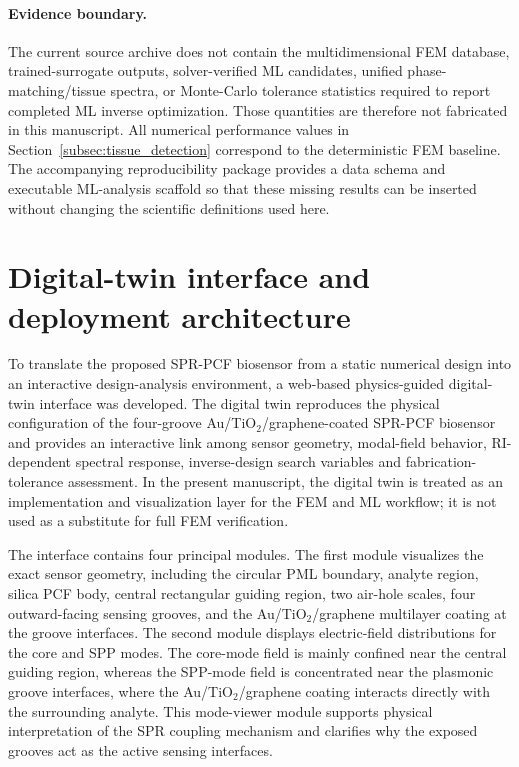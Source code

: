 \documentclass[5p,times,twocolumn]{elsarticle}
\begin{document}
\paragraph{Evidence boundary.}
The current source archive does not contain the multidimensional FEM database, trained-surrogate outputs, solver-verified ML candidates, unified phase-matching/tissue spectra, or Monte-Carlo tolerance statistics required to report completed ML inverse optimization. Those quantities are therefore not fabricated in this manuscript. All numerical performance values in Section~\ref{subsec:tissue_detection} correspond to the deterministic FEM baseline. The accompanying reproducibility package provides a data schema and executable ML-analysis scaffold so that these missing results can be inserted without changing the scientific definitions used here.



\section{Digital-twin interface and deployment architecture}
\label{sec:digital_twin}

To translate the proposed SPR-PCF biosensor from a static numerical design into an interactive design-analysis environment, a web-based physics-guided digital-twin interface was developed. The digital twin reproduces the physical configuration of the four-groove Au/TiO$_2$/graphene-coated SPR-PCF biosensor and provides an interactive link among sensor geometry, modal-field behavior, RI-dependent spectral response, inverse-design search variables and fabrication-tolerance assessment. In the present manuscript, the digital twin is treated as an implementation and visualization layer for the FEM and ML workflow; it is not used as a substitute for full FEM verification.

The interface contains four principal modules. The first module visualizes the exact sensor geometry, including the circular PML boundary, analyte region, silica PCF body, central rectangular guiding region, two air-hole scales, four outward-facing sensing grooves, and the Au/TiO$_2$/graphene multilayer coating at the groove interfaces. The second module displays electric-field distributions for the core and SPP modes. The core-mode field is mainly confined near the central guiding region, whereas the SPP-mode field is concentrated near the plasmonic groove interfaces, where the Au/TiO$_2$/graphene coating interacts directly with the surrounding analyte. This mode-viewer module supports physical interpretation of the SPR coupling mechanism and clarifies why the exposed grooves act as the active sensing interfaces.
\end{document}
